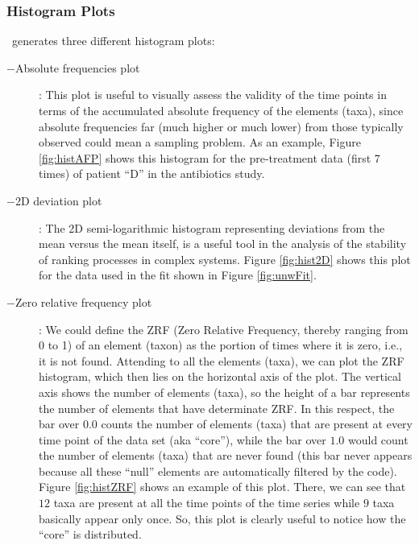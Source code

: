 \subsubsection*{Histogram Plots} 
\CC\ generates three different histogram plots:
\begin{description}
	\item[$-$Absolute frequencies plot]: This plot is useful to visually assess the validity of the time points in terms of the accumulated absolute frequency of the elements (taxa), since absolute frequencies far (much higher or much lower) from those typically observed could mean a sampling problem. As an example, Figure \ref{fig:histAFP} shows this histogram for the pre-treatment data (first 7 times) of patient ``D'' in the antibiotics study\cite{antibiotic}. 
	\item[$-$2D deviation plot]: The 2D semi-logarithmic histogram representing deviations from the mean versus the mean itself, is a useful tool in the analysis of the stability of ranking processes in complex systems\cite{ranking}. Figure \ref{fig:hist2D} shows this plot for the data used in the fit shown in Figure \ref{fig:unwFit}.
	\item[$-$Zero relative frequency plot]: We could define the ZRF (Zero Relative Frequency, thereby ranging from 0 to 1) of an element (taxon) as the portion of times where it is zero, i.e., it is not found. Attending to all the elements (taxa), we can plot the ZRF histogram, which then lies on the horizontal axis of the plot. The vertical axis shows the number of elements (taxa), so the height of a bar represents the number of elements that have determinate ZRF. In this respect, the bar over $0.0$ counts the number of elements (taxa) that are present at every time point of the data set (aka ``core''), while the bar over $1.0$ would count the number of elements (taxa) that are never found (this bar never appears because all these ``null'' elements are automatically filtered by the code). Figure \ref{fig:histZRF} shows an example of this plot. There, we can see that $12$ taxa are present at all the time points of the time series while $9$ taxa basically appear only once. So, this plot is clearly useful to notice how the ``core'' is distributed.
\end{description}

